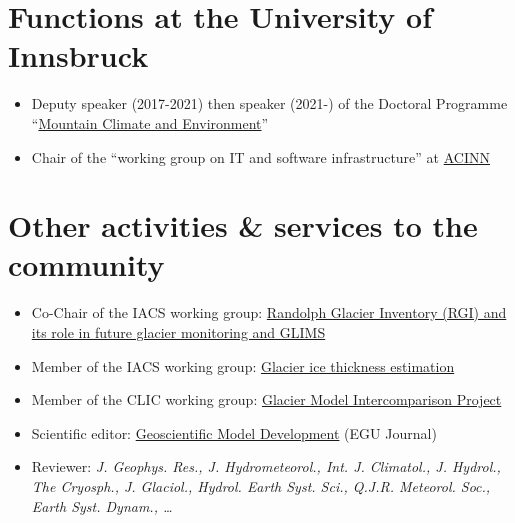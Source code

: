 \section*{Functions at the University of Innsbruck}
\label{\detokenize{ch08/cv:functions-at-the-university-of-innsbruck}}\begin{itemize}[nosep]
\item {} 
Deputy speaker (2017-2021) then speaker (2021-) of the Doctoral Programme “\href{https://www.uibk.ac.at/alpinerraum/dps/dp-mountainclimate/}{Mountain Climate and Environment}”

\item {} 
Chair of the “working group on IT and software infrastructure” at \href{https://www.uibk.ac.at/acinn}{ACINN}

\end{itemize}


\section*{Other activities \& services to the community}
\label{\detokenize{ch08/cv:other-activities-services-to-the-community}}\begin{itemize}[nosep]
\item {} 
Co-Chair of the IACS working group: \href{https://cryosphericsciences.org/activities/working-groups/rgi-working-group/}{Randolph Glacier Inventory (RGI) and its role in future glacier monitoring and GLIMS}

\item {} 
Member of the IACS working group: \href{https://cryosphericsciences.org/activities/ice-thickness/}{Glacier ice thickness estimation}

\item {} 
Member of the CLIC working group: \href{http://www.climate-cryosphere.org/mips/glaciermip}{Glacier Model Intercomparison Project}

\item {} 
Scientific editor: \href{https://www.geosci-model-dev.net/}{Geoscientific Model Development} (EGU Journal)

\item {} 
Reviewer: \textit{J. Geophys. Res., J. Hydrometeorol., Int. J. Climatol., J. Hydrol., The Cryosph., J. Glaciol., Hydrol. Earth Syst. Sci., Q.J.R. Meteorol. Soc., Earth Syst. Dynam., …}

\end{itemize}



